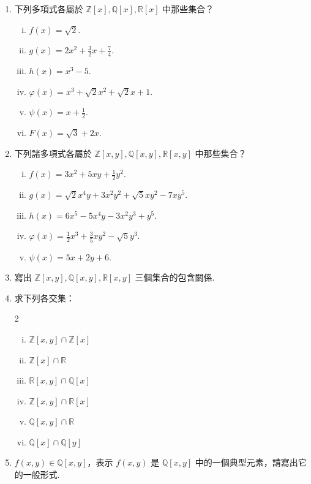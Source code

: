 \begin{enumerate}[1.]
  \item 下列多項式各屬於 $\mathbb{Z}[x], \mathbb{Q}[x], \mathbb{R}[x]$ 中那些集合？
  \begin{enumerate}[(i)]
    \item $f(x)=\sqrt{2}$.
    \item $g(x)=2x^2+\frac{3}{2}x+\frac{7}{4}$.
    \item $h(x)=x^3-5$.
    \item $\varphi(x)=x^3+\sqrt{2}x^2+\sqrt{2}x+1$.
    \item $\psi(x)=x+\frac{1}{2}$.
    \item $F(x)=\sqrt{3}+2x$.
  \end{enumerate}

  \item 下列諸多項式各屬於 $\mathbb{Z}[x,y], \mathbb{Q}[x,y], \mathbb{R}[x,y]$ 中那些集合？
  \begin{enumerate}[(i)]
    \item $f(x)=3x^2+5xy+\frac{1}{2}y^2$.
    \item $g(x)=\sqrt{2}x^4 y+3x^2 y^2+\sqrt{5}xy^2-7xy^5$.
    \item $h(x)=6x^5-5x^4 y-3x^2 y^3+y^5$.
    \item $\varphi(x)=\frac{1}{2}x^3+\frac{3}{5}xy^2-\sqrt{5}y^3$.
    \item $\psi(x)=5x+2y+6$.
  \end{enumerate}

  \item 寫出 $\mathbb{Z}[x,y], \mathbb{Q}[x,y], \mathbb{R}[x,y]$ 三個集合的包含關係.

  \item 求下列各交集：
  \begin{multicols}{2}
  \begin{enumerate}[(i)]
    \item $\mathbb{Z}[x,y] \cap \mathbb{Z}[x]$
    \item $\mathbb{Z}[x] \cap \mathbb{R}$
    \item $\mathbb{R}[x,y] \cap \mathbb{Q}[x]$
    \item $\mathbb{Z}[x,y] \cap \mathbb{R}[x]$
    \item $\mathbb{Q}[x,y] \cap \mathbb{R}$
    \item $\mathbb{Q}[x] \cap \mathbb{Q}[y]$
  \end{enumerate}
  \end{multicols}

  \item $f(x,y) \in \mathbb{Q}[x,y]$，表示 $f(x,y)$ 是 $\mathbb{Q}[x,y]$ 中的一個典型元素，請寫出它的一般形式.
\end{enumerate}

